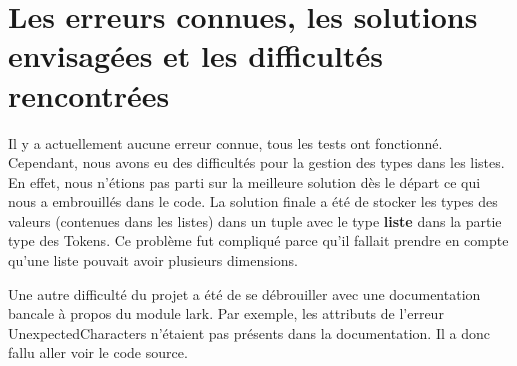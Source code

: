 \section{Les erreurs connues, les solutions envisagées et les difficultés rencontrées}
Il y a actuellement aucune erreur connue, tous les tests ont fonctionné. Cependant, nous avons eu des difficultés pour la gestion des types dans les listes.
En effet, nous n'étions pas parti sur la meilleure solution dès le départ ce qui nous a embrouillés dans le code.
La solution finale a été de stocker les types des valeurs (contenues dans les listes) dans un tuple avec le type \textbf{liste} dans la partie type des Tokens.
Ce problème fut compliqué parce qu'il fallait prendre en compte qu'une liste pouvait avoir plusieurs dimensions.

Une autre difficulté du projet a été de se débrouiller avec une documentation bancale à propos du module lark.
Par exemple, les attributs de l'erreur UnexpectedCharacters n'étaient pas présents dans la documentation. Il a donc fallu aller voir le code source.
